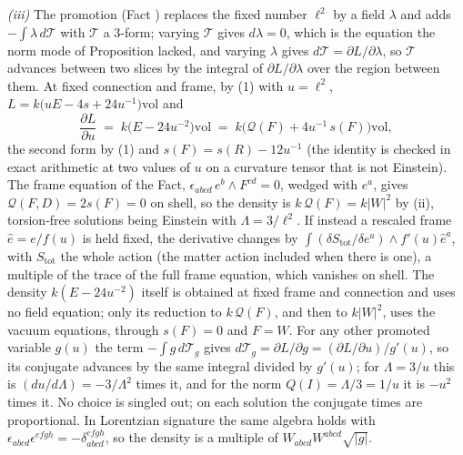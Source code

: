 \emph{(iii)} The promotion (Fact ) replaces the fixed number $\ell^{2}$ by a field $\lambda$ and adds $-\int\lambda\,d\mathcal{T}$ with $\mathcal{T}$ a $3$-form; varying $\mathcal{T}$ gives $d\lambda = 0$, which is the equation the norm mode of Proposition  lacked, and varying $\lambda$ gives $d\mathcal{T} = \partial L/\partial\lambda$, so $\mathcal{T}$ advances between two slices by the integral of $\partial L/\partial\lambda$ over the region between them. At fixed connection and frame, by (1) with $u = \ell^{2}$, $L = k\bigl(uE - 4s + 24u^{-1}\bigr)\mathrm{vol}$ and
\[
\frac{\partial L}{\partial u} \;=\; k\bigl(E - 24u^{-2}\bigr)\mathrm{vol} \;=\; k\bigl(\mathcal{Q}(F) + 4u^{-1}\,s(F)\bigr)\mathrm{vol},
\]
the second form by (1) and $s(F) = s(R) - 12u^{-1}$ (the identity is checked in exact arithmetic at two values of $u$ on a curvature tensor that is not Einstein). The frame equation of the Fact, $\epsilon_{abcd}\,e^{b}\wedge F^{cd} = 0$, wedged with $e^{a}$, gives $\mathcal{Q}(F, D) = 2s(F) = 0$ on shell, so the density is $k\,\mathcal{Q}(F) = k|W|^{2}$ by (ii), torsion-free solutions being Einstein with $\Lambda = 3/\ell^{2}$. If instead a rescaled frame $\hat e = e/f(u)$ is held fixed, the derivative changes by $\int (\delta S_{\mathrm{tot}}/\delta e^{a})\wedge f'(u)\hat e^{a}$, with $S_{\mathrm{tot}}$ the whole action (the matter action included when there is one), a multiple of the trace of the full frame equation, which vanishes on shell. The density $k(E - 24u^{-2})$ itself is obtained at fixed frame and connection and uses no field equation; only its reduction to $k\,\mathcal{Q}(F)$, and then to $k|W|^{2}$, uses the vacuum equations, through $s(F) = 0$ and $F = W$. For any other promoted variable $g(u)$ the term $-\int g\,d\mathcal{T}_{g}$ gives $d\mathcal{T}_{g} = \partial L/\partial g = (\partial L/\partial u)/g'(u)$, so its conjugate advances by the same integral divided by $g'(u)$; for $\Lambda = 3/u$ this is $(du/d\Lambda) = -3/\Lambda^{2}$ times it, and for the norm $Q(I) = \Lambda/3 = 1/u$ it is $-u^{2}$ times it. No choice is singled out; on each solution the conjugate times are proportional. In Lorentzian signature the same algebra holds with $\epsilon_{abcd}\epsilon^{efgh} = -\delta^{efgh}_{abcd}$, so the density is a multiple of $W_{abcd}W^{abcd}\sqrt{|g|}$.


